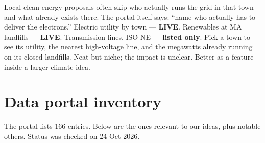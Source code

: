 \documentclass[11pt]{article}
\newcommand{\LIVE}{\textcolor{okgreen}{\textbf{LIVE}}}
\newcommand{\LISTED}{\textcolor{greyish}{\textbf{listed only}}}
\begin{document}
{Local clean-energy proposals often skip who actually runs the grid in that town and what
already exists there. The portal itself says: ``name who actually has to deliver the electrons.''}
{Electric utility by town --- \LIVE. Renewables at MA landfills --- \LIVE. Transmission lines, ISO-NE --- \LISTED.}
{Pick a town to see its utility, the nearest high-voltage line, and the megawatts already
running on its closed landfills.}
{Neat but niche; the impact is unclear. Better as a feature inside a larger climate idea.}

\section{Data portal inventory}
The portal lists 166 entries. Below are the ones relevant to our ideas, plus notable
others. Status was checked on 24 Oct 2026.
\end{document}
